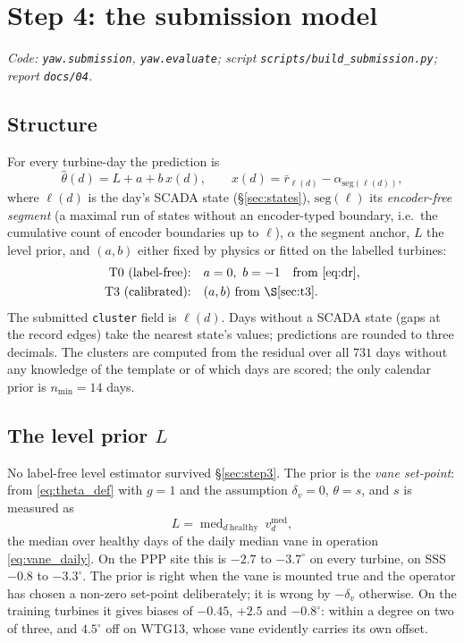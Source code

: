 \documentclass[11pt,a4paper]{article}
\theoremstyle{remark}
\newcommand{\med}{\operatorname{med}}
\newcommand{\dg}{^{\circ}}
\newcommand{\code}[1]{\texttt{#1}}
\begin{document}
\section{Step 4: the submission model}\label{sec:step4}
\begin{sloppypar}
\emph{Code: \code{yaw.submission}, \code{yaw.evaluate}; script
\code{scripts/build\_submission.py}; report \code{docs/04}.}
\end{sloppypar}

\subsection{Structure}
For every turbine-day the prediction is
\begin{equation}
  \hat\theta(d) = L + a + b\,x(d),\qquad
  x(d) = \bar r_{\ell(d)} - \alpha_{\mathrm{seg}(\ell(d))},
  \label{eq:submission}
\end{equation}
where $\ell(d)$ is the day's SCADA state (\S\ref{sec:states}),
$\mathrm{seg}(\ell)$ its \emph{encoder-free segment} (a maximal run of states
without an encoder-typed boundary, i.e.\ the cumulative count of encoder
boundaries up to $\ell$), $\alpha$ the segment anchor, $L$ the level prior, and
$(a,b)$ either fixed by physics or fitted on the labelled turbines:
\begin{align*}
  \text{T0 (label-free):}\quad & a=0,\ b=-1 \quad\text{from \eqref{eq:dr}},\\
  \text{T3 (calibrated):}\quad & (a,b) \text{ from \S\ref{sec:t3}}.
\end{align*}
The submitted \code{cluster} field is $\ell(d)$. Days without a SCADA state
(gaps at the record edges) take the nearest state's values; predictions are
rounded to three decimals. The clusters are computed from the residual over
all $731$ days without any knowledge of the template or of which days are
scored; the only calendar prior is $n_{\min}=14$ days.

\subsection{The level prior $L$}
No label-free level estimator survived \S\ref{sec:step3}. The prior is the
\emph{vane set-point}: from \eqref{eq:theta_def} with $g=1$ and the assumption
$\delta_v=0$, $\theta=s$, and $s$ is measured as
\begin{equation}
  L = \med_{d\ \text{healthy}}\ v^{\med}_d ,
  \label{eq:L}
\end{equation}
the median over healthy days of the daily median vane in operation
\eqref{eq:vane_daily}. On the PPP site this is $-2.7$ to $-3.7\dg$ on every
turbine, on SSS $-0.8$ to $-3.3\dg$. The prior is right when the vane is
mounted true and the operator has chosen a non-zero set-point deliberately; it
is wrong by $-\delta_v$ otherwise. On the training turbines it gives biases of
$-0.45$, $+2.5$ and $-0.8\dg$: within a degree on two of three, and $4.5\dg$ off
on WTG13, whose vane evidently carries its own offset.
\end{document}
